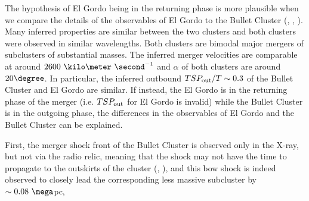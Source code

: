 \documentclass[letterpaper,useAMS,usenatbib]{mn2e}
\begin{document}
The hypothesis of El Gordo being in the returning phase is more plausible when
we compare the details of the observables of El Gordo to the Bullet
Cluster (\citealt{Bradac2006b}, \citealt{Springel2007},
\citealt{Mastropietro2008a}).
Many inferred properties are similar between the two clusters and
both clusters were observed in similar wavelengths. Both clusters are
bimodal major mergers of subclusters of substantial masses. The inferred
merger velocities are comparable at around $2600~\kilo\meter~\second^{-1}$
and $\alpha$ of both clusters are around $20 \degree$. 
In particular, the inferred outbound $TSP_{\rm out} / T \sim 0.3$ of the Bullet Cluster and El Gordo
are similar. If instead, the El Gordo
is in the returning phase of the merger (i.e. $TSP_{\rm out}$ for El Gordo is
invalid) while the Bullet Cluster is in the outgoing phase, the differences
in the observables of El Gordo and the Bullet Cluster can be explained.\par
First, the merger shock front of the Bullet Cluster is
observed only in the X-ray, but not via the radio relic, meaning that the shock may not have the
time to propagate to the outskirts of the cluster (\citealt{Bruggen2011},
\citealt{Markevitch2007}), and this bow shock is indeed observed to closely
lead the corresponding less massive subcluster by $\sim 0.08~\mega$pc,
\end{document}
